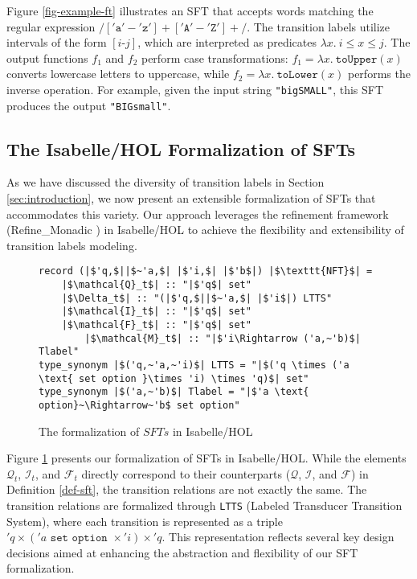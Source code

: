 \documentclass[a4paper,UKenglish,cleveref, autoref, thm-restate]{lipics-v2021}
\begin{document}
    Figure \ref{fig-example-ft} illustrates an SFT that accepts words matching the regular expression $/['\texttt{a}'-'\texttt{z}']+['\texttt{A}'-'\texttt{Z}']+/$. The transition labels utilize intervals of the form $[i\text{-}j]$, which are interpreted as predicates $\lambda x.~i \leq x \leq j$. The output functions $f_1$ and $f_2$ perform case transformations: $f_1 = \lambda x.~\texttt{toUpper}(x)$ converts lowercase letters to uppercase, while $f_2 = \lambda x.~\texttt{toLower}(x)$ performs the inverse operation. For example, given the input string \texttt{"bigSMALL"}, this SFT produces the output \texttt{"BIGsmall"}.







\subsection{The Isabelle/HOL Formalization of SFTs}

As we have discussed the diversity of transition labels in Section \ref{sec:introduction}, we now present an extensible formalization of SFTs that accommodates this variety. Our approach leverages the refinement framework (Refine\_Monadic \cite{Refine_Monadic-AFP}) in Isabelle/HOL to achieve the flexibility and extensibility of transition labels modeling.

\begin{figure}[hbt!]
	\begin{lstlisting}
record (|$'q,$||$~'a,$| |$'i,$| |$'b$|) |$\texttt{NFT}$| =
	|$\mathcal{Q}_t$| :: "|$'q$| set"
	|$\Delta_t$| :: "(|$'q,$||$~'a,$| |$'i$|) LTTS"
	|$\mathcal{I}_t$| :: "|$'q$| set"
	|$\mathcal{F}_t$| :: "|$'q$| set"
        |$\mathcal{M}_t$| :: "|$'i\Rightarrow ('a,~'b)$| Tlabel"
type_synonym |$('q,~'a,~'i)$| LTTS = "|$('q \times ('a \text{ set option }\times 'i) \times 'q)$| set"
type_synonym |$('a,~'b)$| Tlabel = "|$'a \text{ option}~\Rightarrow~'b$ set option"
	\end{lstlisting}
\caption{The formalization of $SFTs$ in Isabelle/HOL}
\label{fig-def-FT}
\end{figure}

Figure \ref{fig-def-FT} presents our formalization of SFTs in Isabelle/HOL. While the elements $\mathcal{Q}_t$, $\mathcal{I}_t$, and $\mathcal{F}_t$ directly correspond to their counterparts ($\mathcal{Q}$, $\mathcal{I}$, and $\mathcal{F}$) in Definition \ref{def-sft}, the transition relations are not exactly the same.
%
The transition relations are formalized through \texttt{LTTS} (Labeled Transducer Transition System), where each transition is represented as a triple $'q \times ('a \texttt{ set option }\times 'i) \times 'q$. This representation reflects several key design decisions aimed at enhancing the abstraction and flexibility of our SFT formalization. 
\end{document}
